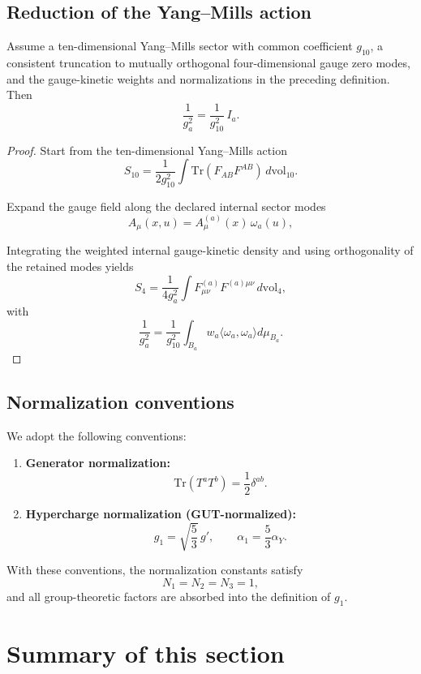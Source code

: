 \documentclass[11pt]{article}
\begin{document}
\subsection{Reduction of the Yang--Mills action}

\begin{proposition}
Assume a ten-dimensional Yang--Mills sector with common coefficient
$g_{10}$, a consistent truncation to mutually orthogonal four-dimensional
gauge zero modes, and the gauge-kinetic weights and normalizations in the
preceding definition. Then
\[
\frac{1}{g_a^2} = \frac{1}{g_{10}^2}\, I_a.
\]
\end{proposition}

\begin{proof}
Start from the ten-dimensional Yang--Mills action
\[
S_{10} = \frac{1}{2g_{10}^2}\int \mathrm{Tr}(F_{AB}F^{AB})\, d\mathrm{vol}_{10}.
\]

Expand the gauge field along the declared internal sector modes
\[
A_\mu(x,u) = A_\mu^{(a)}(x)\,\omega_a(u),
\]

Integrating the weighted internal gauge-kinetic density and using orthogonality
of the retained modes yields
\[
S_4 = \frac{1}{4g_a^2}\int F_{\mu\nu}^{(a)}F^{(a)\mu\nu}\, d\mathrm{vol}_4,
\]
with
\[
\frac{1}{g_a^2}
=\frac{1}{g_{10}^2}
\int_{B_a}w_a\langle\omega_a,\omega_a\rangle d\mu_{B_a}.
\]
\end{proof}

\subsection{Normalization conventions}

We adopt the following conventions:

\begin{enumerate}
\item \textbf{Generator normalization:}
\[
\mathrm{Tr}(T^a T^b)=\frac{1}{2}\delta^{ab}.
\]

\item \textbf{Hypercharge normalization (GUT-normalized):}
\[
g_1=\sqrt{\frac{5}{3}}\, g',
\qquad
\alpha_1=\frac{5}{3}\alpha_Y.
\]
\end{enumerate}

With these conventions, the normalization constants satisfy
\[
N_1=N_2=N_3=1,
\]
and all group-theoretic factors are absorbed into the definition of $g_1$.

\section{Summary of this section}
\end{document}
